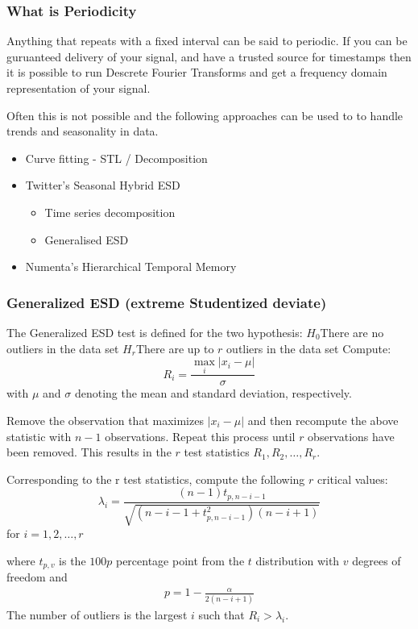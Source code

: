 \documentclass[aspectratio=169]{beamer}
\begin{document}
\begin{frame}
\frametitle{What is Periodicity}
Anything that repeats with a fixed interval can be said to periodic. If you can
be guruanteed delivery of your signal, and have a trusted source for timestamps 
then it is possible to run Descrete Fourier Transforms and get a frequency domain 
representation of your signal.   

Often this is not possible and the following approaches can be used to to handle trends
and seasonality in data. 
\begin{itemize}
\item Curve fitting - STL / Decomposition
\item Twitter's Seasonal Hybrid ESD \cite{ref:twitter-blog}
\begin{itemize}
    \item Time series decomposition
    \item Generalised ESD
\end{itemize}
\item Numenta's Hierarchical Temporal Memory \cite{ref:numenta-whitepaper}
\end{itemize} 

\end{frame}

\begin{frame}[allowframebreaks]
\frametitle{Generalized ESD (extreme Studentized deviate)}
The Generalized ESD\cite{ref:rosner} test is defined for the two hypothesis:\newline
$H_0$\hspace{24pt}There are no outliers in the data set\newline
$H_r$\hspace{24pt}There are up to $r$ outliers in the data set\newline
Compute:\newline
\begin{equation}
R_i=\frac{\max_i | x_i - \mu | }{\sigma}
\end{equation}
with $\mu$ and $\sigma$ denoting the mean and standard deviation, respectively.

Remove the observation that maximizes $| x_i - \mu |$ and then recompute the above statistic with $n - 1$ observations. Repeat this process until $r$ observations have been removed. This results in the $r$ test statistics $R_1, R_2, \ldots, R_r$.

Corresponding to the r test statistics, compute the following $r$ critical values:\newline
\begin{equation}
\lambda_i=\frac{ (n-1)t_{p,n-i-1}}{\sqrt{(n-i-1 + t^2_{p, n-i-1})(n-i+1)}}  
\end{equation}
for $i=1,2,\ldots,r$

where $t_{p,v}$ is the $100p$ percentage point from the $t$ distribution with $v$ degrees of freedom and
\begin{align*}
p = 1 - \frac{\alpha}{2(n-i+1)}
\end{align*}
The number of outliers is the largest $i$ such that $R_i > λ_i$.
\end{frame}
\AtBeginPart{}
\end{document}
